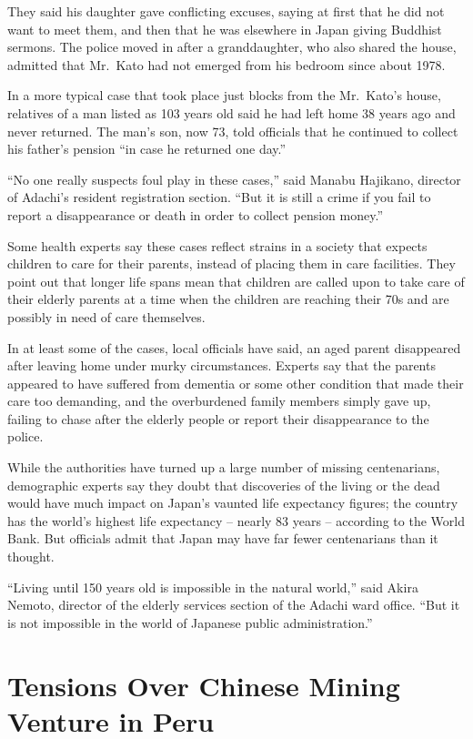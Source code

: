﻿\documentclass[12pt]{article}
\begin{document}
They said his daughter gave conflicting excuses, saying at first that he did not want to meet them,
and then that he was elsewhere in Japan giving Buddhist sermons. The police moved in after a
granddaughter, who also shared the house, admitted that Mr.~Kato had not emerged from his bedroom
since about 1978.

In a more typical case that took place just blocks from the Mr.~Kato's house, relatives of a man
listed as 103 years old said he had left home 38 years ago and never returned. The man's son, now
73, told officials that he continued to collect his father's pension ``in case he returned one
day.''

``No one really suspects foul play in these cases,'' said Manabu Hajikano, director of Adachi's
resident registration section. ``But it is still a crime if you fail to report a disappearance or
death in order to collect pension money.''

Some health experts say these cases reflect strains in a society that expects children to care for
their parents, instead of placing them in care facilities. They point out that longer life spans
mean that children are called upon to take care of their elderly parents at a time when the children
are reaching their 70s and are possibly in need of care themselves.

In at least some of the cases, local officials have said, an aged parent disappeared after leaving
home under murky circumstances. Experts say that the parents appeared to have suffered from dementia
or some other condition that made their care too demanding, and the overburdened family members
simply gave up, failing to chase after the elderly people or report their disappearance to the
police.

While the authorities have turned up a large number of missing centenarians, demographic experts say
they doubt that discoveries of the living or the dead would have much impact on Japan's vaunted life
expectancy figures; the country has the world's highest life expectancy -- nearly 83 years --
according to the World Bank. But officials admit that Japan may have far fewer centenarians than it
thought.

``Living until 150 years old is impossible in the natural world,'' said Akira Nemoto, director of
the elderly services section of the Adachi ward office. ``But it is not impossible in the world of
Japanese public administration.''

\section{Tensions Over Chinese Mining Venture in Peru}
\end{document}
